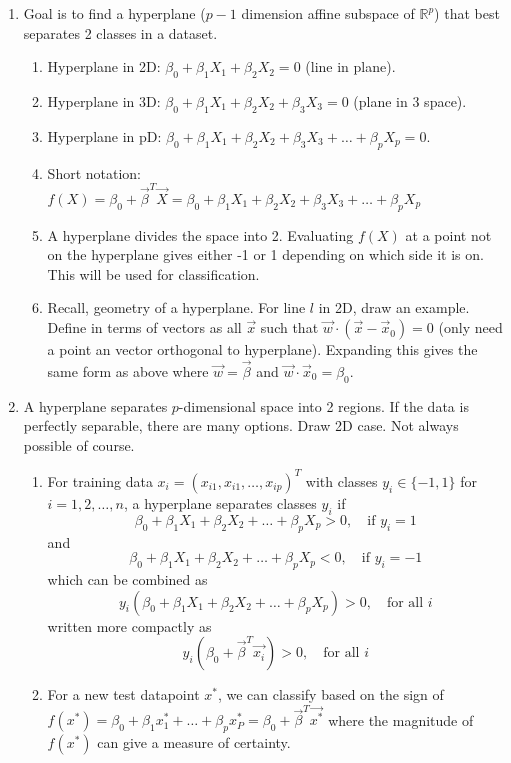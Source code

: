 \documentclass{article}
\begin{document}
\begin{enumerate}
\item Goal is to find a hyperplane ($p-1$ dimension affine subspace of $\mathbb{R}^p$) that best separates 2 classes in a dataset.
\begin{enumerate}
\item Hyperplane in 2D: $\beta_0 + \beta_1 X_1 + \beta_2 X_2 = 0$ (line in plane).
\item Hyperplane in 3D: $\beta_0 + \beta_1 X_1 + \beta_2 X_2 + \beta_3 X_3 = 0$ (plane in 3 space).
\item Hyperplane in pD: $\beta_0 + \beta_1 X_1 + \beta_2 X_2 + \beta_3 X_3 + \dots + \beta_p X_p = 0$.
\item Short notation: $f(X) = \beta_0 + \vec{\beta}^T \vec{X} = \beta_0 + \beta_1 X_1 + \beta_2 X_2 + \beta_3 X_3 + \dots + \beta_p X_p$
\item A hyperplane divides the space into 2. Evaluating $f(X)$ at a point not on the hyperplane gives either -1 or 1 depending on which side it is on. This will be used for classification.
\item Recall, geometry of a hyperplane. For line $l$ in 2D, draw an example. Define in terms of vectors as all $\vec{x}$ such that $\vec{w} \cdot (\vec{x} - \vec{x}_0 ) = 0$ (only need a point an vector orthogonal to hyperplane). Expanding this gives the same form as above where $\vec{w} = \vec{\beta}$ and $\vec{w} \cdot \vec{x}_0 = \beta_0$.
\end{enumerate}

\item A hyperplane separates $p$-dimensional space into 2 regions. If the data is perfectly separable, there are many options. Draw 2D case. Not always possible of course.
\begin{enumerate}
\item For training data $x_i = (x_{i1}, x_{i1}, \dots , x_{ip})^T$ with classes $y_i \in \{-1,1 \}$ for $i=1,2,\dots,n$, a hyperplane separates classes $y_i$ if
\[
\beta_0 + \beta_1 X_1 + \beta_2 X_2 + \dots + \beta_p X_p > 0, \quad \text{if $y_i=1$}
\]
and
\[
\beta_0 + \beta_1 X_1 + \beta_2 X_2 + \dots + \beta_p X_p < 0, \quad \text{if $y_i=-1$}
\]
which can be combined as
\[
y_i \left(\beta_0 + \beta_1 X_1 + \beta_2 X_2 + \dots + \beta_p X_p \right) > 0, \quad \text{for all $i$}
\]
written more compactly as
\[
y_i \left( \beta_0 + \vec{\beta}^T \vec{x_i}\right) > 0, \quad \text{for all $i$}
\]
\item For a new test datapoint $x^*$, we can classify based on the sign of $f(x^*) = \beta_0 + \beta_1 x_1^* + \dots + \beta_p x_P^* = \beta_0 + \vec{\beta}^T \vec{x^*}$ where the magnitude of $f(x^*)$ can give a measure of certainty.
\end{enumerate}


\end{enumerate}
\end{document}
